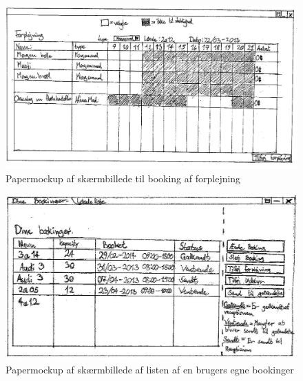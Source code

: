 \begin{figure}[h!]
  \centering
    \includegraphics[angle=90, height=0.9\textheight]{Appendix/GUI-Prototype/PaperMockup/Forplejning_001}
  \caption{Papermockup af  skærmbillede til booking af forplejning}
\label{App_GUI_paper_Forplejning}
\end{figure}

\begin{figure}[h!]
  \centering
    \includegraphics[angle=90, height=0.9\textheight]{Appendix/GUI-Prototype/PaperMockup/Dinebookinger_001}
  \caption{Papermockup af  skærmbillede af listen af en brugers egne bookinger}
\label{App_GUI_paper_DineBookinger}
\end{figure}


